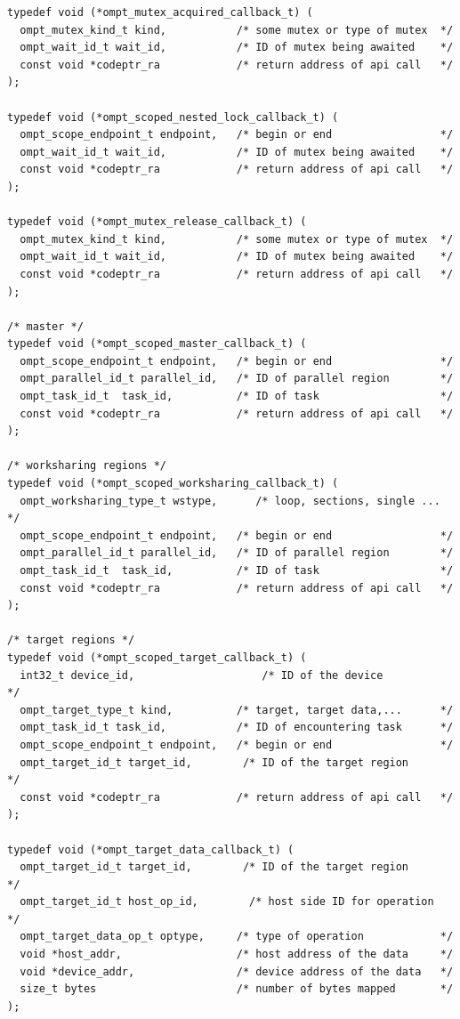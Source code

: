 \documentclass{article}
\begin{document}
\begin{verbatim}
typedef void (*ompt_mutex_acquired_callback_t) ( 
  ompt_mutex_kind_t kind,           /* some mutex or type of mutex  */ 
  ompt_wait_id_t wait_id,           /* ID of mutex being awaited    */
  const void *codeptr_ra            /* return address of api call   */          
);

typedef void (*ompt_scoped_nested_lock_callback_t) ( 
  ompt_scope_endpoint_t endpoint,   /* begin or end                 */ 
  ompt_wait_id_t wait_id,           /* ID of mutex being awaited    */
  const void *codeptr_ra            /* return address of api call   */          
);

typedef void (*ompt_mutex_release_callback_t) ( 
  ompt_mutex_kind_t kind,           /* some mutex or type of mutex  */
  ompt_wait_id_t wait_id,           /* ID of mutex being awaited    */
  const void *codeptr_ra            /* return address of api call   */       
);

/* master */
typedef void (*ompt_scoped_master_callback_t) ( 
  ompt_scope_endpoint_t endpoint,   /* begin or end                 */ 			   
  ompt_parallel_id_t parallel_id,   /* ID of parallel region        */
  ompt_task_id_t  task_id,          /* ID of task                   */
  const void *codeptr_ra            /* return address of api call   */
);

/* worksharing regions */								    
typedef void (*ompt_scoped_worksharing_callback_t) (
  ompt_worksharing_type_t wstype,	   /* loop, sections, single ...   */	
  ompt_scope_endpoint_t endpoint,   /* begin or end                 */ 		   
  ompt_parallel_id_t parallel_id,   /* ID of parallel region        */
  ompt_task_id_t  task_id,          /* ID of task                   */
  const void *codeptr_ra            /* return address of api call   */
);							    

/* target regions */
typedef void (*ompt_scoped_target_callback_t) ( 
  int32_t device_id,                    /* ID of the device             */
  ompt_target_type_t kind,          /* target, target data,...      */
  ompt_task_id_t task_id,           /* ID of encountering task      */     
  ompt_scope_endpoint_t endpoint,   /* begin or end                 */ 
  ompt_target_id_t target_id, 	     /* ID of the target region      */
  const void *codeptr_ra            /* return address of api call   */
);

typedef void (*ompt_target_data_callback_t) (
  ompt_target_id_t target_id, 	     /* ID of the target region      */
  ompt_target_id_t host_op_id,	      /* host side ID for operation   */
  ompt_target_data_op_t optype,     /* type of operation            */
  void *host_addr,                  /* host address of the data     */
  void *device_addr,                /* device address of the data   */ 
  size_t bytes                      /* number of bytes mapped       */		
);


\end{verbatim}
\end{document}
